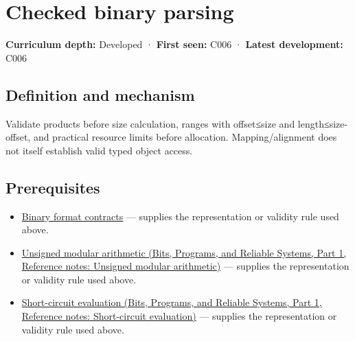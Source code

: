 \hypertarget{appendix-652d81568de9}{}\label{referencestart:appendix-652d81568de9}
\section{Checked binary parsing}\label{appendix-652d81568de9-checked-binary-parsing}

\hypertarget{appendix-652d81568de9-checked-binary-parsing}{}

\textbf{Curriculum depth:} Developed · \textbf{First seen:} C006 · \textbf{Latest development:} C006

\begin{allmightroledefinition}

\subsection{Definition and mechanism}\label{appendix-652d81568de9-definition-and-mechanism}

\hypertarget{appendix-652d81568de9-definition-and-mechanism}{}

Validate products before size calculation, ranges with offset≤size and length≤size-offset, and practical resource limits before allocation. Mapping/alignment does not itself establish valid typed object access.

\end{allmightroledefinition}

\subsection{Prerequisites}\label{appendix-652d81568de9-prerequisites}

\hypertarget{appendix-652d81568de9-prerequisites}{}

\begin{itemize}
\tightlist
\item
  \hyperref[appendix-590bbb2424c1]{Binary format contracts} --- supplies the representation or validity rule used above.
\item
  \href{../01-Bits-Programs-and-Reliable-Systems-P01/main.pdf\#nameddest=appendix-c99977d88b33}{Unsigned modular arithmetic (Bits, Programs, and Reliable Systems, Part 1, Reference notes: Unsigned modular arithmetic)} --- supplies the representation or validity rule used above.
\item
  \href{../01-Bits-Programs-and-Reliable-Systems-P01/main.pdf\#nameddest=appendix-2e245a6fa8d3}{Short-circuit evaluation (Bits, Programs, and Reliable Systems, Part 1, Reference notes: Short-circuit evaluation)} --- supplies the representation or validity rule used above.
\end{itemize}

